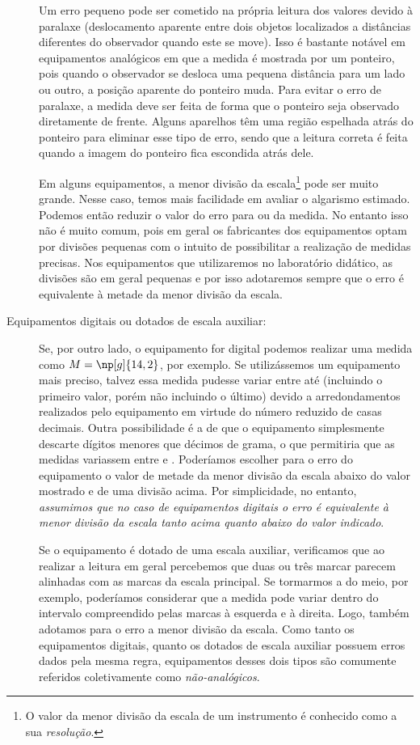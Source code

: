 \begin{description}
	Um erro pequeno pode ser cometido na própria leitura dos valores devido à paralaxe (deslocamento aparente entre dois objetos localizados a distâncias diferentes do observador quando este se move). Isso é bastante notável em equipamentos analógicos em que a medida é mostrada por um ponteiro, pois quando o observador se desloca uma pequena distância para um lado ou outro, a posição aparente do ponteiro muda. Para evitar o erro de paralaxe, a medida deve ser feita de forma que o ponteiro seja observado diretamente de frente. Alguns aparelhos têm uma região espelhada atrás do ponteiro para eliminar esse tipo de erro, sendo que a leitura correta é feita quando a imagem do ponteiro fica escondida atrás dele.
	
	Em alguns equipamentos, a menor divisão da escala\footnote{O valor da menor divisão da escala de um instrumento é conhecido como a sua \emph{resolução}.} pode ser muito grande. Nesse caso, temos mais facilidade em avaliar o algarismo estimado. Podemos então reduzir o valor do erro para  ou  da medida. No entanto isso não é muito comum, pois em geral os fabricantes dos equipamentos optam por divisões pequenas com o intuito de possibilitar a realização de medidas precisas. Nos equipamentos que utilizaremos no laboratório didático, as divisões são em geral pequenas e por isso adotaremos sempre que o erro é equivalente à metade da menor divisão da escala.

	\item[Equipamentos digitais ou dotados de escala auxiliar:] Se, por outro lado, o equipamento for digital podemos realizar uma medida como $M = \np[g]{14,2}$, por exemplo. Se utilizássemos um equipamento mais preciso, talvez essa medida pudesse variar entre  até  (incluindo o primeiro valor, porém não incluindo o último) devido a arredondamentos realizados pelo equipamento em virtude do número reduzido de casas decimais. Outra possibilidade é a de que o equipamento simplesmente descarte dígitos menores que décimos de grama, o que permitiria que as medidas variassem entre  e . Poderíamos escolher para o erro do equipamento o valor de metade da menor divisão da escala abaixo do valor mostrado e de uma divisão acima. Por simplicidade, no entanto, \emph{assumimos que no caso de equipamentos digitais o erro é equivalente à menor divisão da escala tanto acima quanto abaixo do valor indicado}.
	
	Se o equipamento é dotado de uma escala auxiliar, verificamos que ao realizar a leitura em geral percebemos que duas ou três marcar parecem alinhadas com as marcas da escala principal. Se tormarmos a do meio, por exemplo, poderíamos considerar que a medida pode variar dentro do intervalo compreendido pelas marcas à esquerda e à direita. Logo, também adotamos para o erro a menor divisão da escala. Como tanto os equipamentos digitais, quanto os dotados de escala auxiliar possuem erros dados pela mesma regra, equipamentos desses dois tipos são comumente referidos coletivamente como \emph{não-analógicos}.
\end{description}

